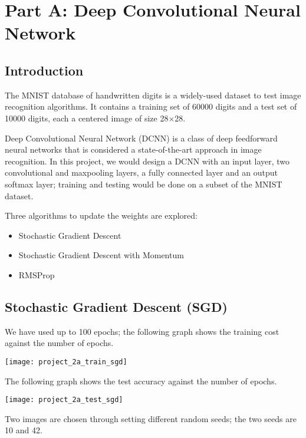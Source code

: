 \section*{Part A\@: Deep Convolutional Neural Network}

\subsection*{Introduction}

The MNIST database of handwritten digits is a widely-used dataset to test image
recognition algorithms. It contains a training set of 60000 digits and a test
set of 10000 digits, each a centered image of size 28\(\times \)28.

Deep Convolutional Neural Network (DCNN) is a class of deep feedforward neural
networks that is considered a state-of-the-art approach in image recognition.
In this project, we would design a DCNN with an input layer, two convolutional
and maxpooling layers, a fully connected layer and an output softmax layer;
training and testing would be done on a subset of the MNIST dataset.

Three algorithms to update the weights are explored:
\begin{itemize}
    \item Stochastic Gradient Descent
    \item Stochastic Gradient Descent with Momentum
    \item RMSProp
\end{itemize}

\subsection*{Stochastic Gradient Descent (SGD)}

We have used up to 100 epochs; the following graph shows the training cost
against the number of epochs.

\begin{center}
    \texttt{[image: project\_2a\_train\_sgd]}
\end{center}

The following graph shows the test accuracy against the number of epochs.

\begin{center}
    \texttt{[image: project\_2a\_test\_sgd]}
\end{center}

Two images are chosen through setting different random seeds; the two seeds
are 10 and 42.

